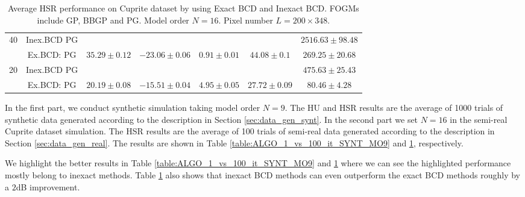 \begin{table}[h]
{\begin{tabular}{|c|c|c|c|c|c|c|}
\multirow{2}{*}{40} & Inex.BCD PG   & \cellcolor{red!10}{$35.93\pm 0.03$} & \cellcolor{red!10}{$-23.38\pm 0.02$} & \cellcolor{red!10}{$0.84\pm 0$}    & \cellcolor{red!10}{$44.77\pm 0.04$} & $2516.63  \pm 98.48$  \tabularnewline
                    & Ex.BCD:  PG   &                   {$35.29\pm 0.12$} &                   {$-23.06\pm 0.06$} &                   {$0.91\pm 0.01$} &                   {$44.08\pm 0.1$}  & $269.25   \pm 20.68$  \tabularnewline \hline
\multirow{2}{*}{20} & Inex.BCD PG   & \cellcolor{red!10}{$22.19\pm 0.05$} & \cellcolor{red!10}{$-16.51\pm 0.02$} & \cellcolor{red!10}{$3.66\pm 0.02$} & \cellcolor{red!10}{$29.88\pm 0.05$} & $475.63   \pm 25.43$  \tabularnewline
                    & Ex.BCD:  PG   &                   {$20.19\pm 0.08$} &                   {$-15.51\pm 0.04$} &                   {$4.95\pm 0.05$} &                   {$27.72\pm 0.09$} & $80.46    \pm 4.28$   \tabularnewline \hline
\end{tabular}
}
\caption{Average HSR performance on Cuprite dataset by using Exact BCD and
         Inexact BCD. FOGMs include GP, BBGP and PG. Model order $N = 16$.
         Pixel number $L = 200 \times 348$.}
\label{table:ALGO_1_vs_100_it_REAL_CUPRITE_MO16}
\end{table}

\newpage
In the first part, we conduct synthetic simulation taking model order $N = 9$.
The HU and HSR results are the average of 1000 trials of synthetic data
generated according to the description in Section \ref{sec:data_gen_synt}.
In the second part we set $N = 16$ in the semi-real Cuprite dataset simulation.
The HSR results are the average of 100 trials of semi-real data generated
according to the description in Section \ref{sec:data_gen_real}.
The results are shown in Table \ref{table:ALGO_1_vs_100_it_SYNT_MO9} and
\ref{table:ALGO_1_vs_100_it_REAL_CUPRITE_MO16}, respectively.

We highlight the better results in Table \ref{table:ALGO_1_vs_100_it_SYNT_MO9}
and \ref{table:ALGO_1_vs_100_it_REAL_CUPRITE_MO16} where we can see the
highlighted performance mostly belong to inexact methods.
Table \ref{table:ALGO_1_vs_100_it_REAL_CUPRITE_MO16} also shows that inexact
BCD methods can even outperform the exact BCD methods roughly by a $2$dB
improvement.

